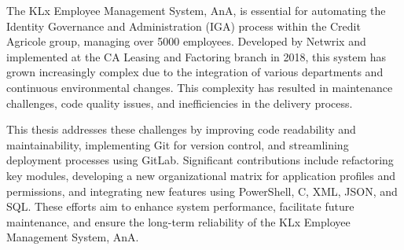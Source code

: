
%

The KLx Employee Management System, AnA, is essential for automating the Identity Governance and Administration (IGA) process within the Credit Agricole group, managing over 5000 employees. Developed by Netwrix and implemented at the CA Leasing and Factoring branch in 2018, this system has grown increasingly complex due to the integration of various departments and continuous environmental changes. This complexity has resulted in maintenance challenges, code quality issues, and inefficiencies in the delivery process.

This thesis addresses these challenges by improving code readability and maintainability, implementing Git for version control, and streamlining deployment processes using GitLab. Significant contributions include refactoring key modules, developing a new organizational matrix for application profiles and permissions, and integrating new features using PowerShell, C, XML, JSON, and SQL. These efforts aim to enhance system performance, facilitate future maintenance, and ensure the long-term reliability of the KLx Employee Management System, AnA.

